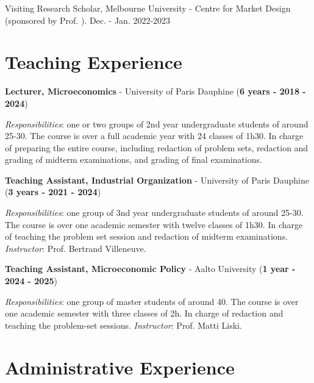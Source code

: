\documentclass[letterpaper]{article}
\newcommand{\MYhref}[3][darkblue]{\href{#2}{\color{#1}{#3}}}%
\renewenvironment{itemize}{
  \begin{list}{}{
    \setlength{\leftmargin}{1.5em}
  }
}{
  \end{list}
}
\begin{document}
\begin{itemize}
\item Visiting Research Scholar, Melbourne University - Centre for Market Design (sponsored by Prof. \textcolor{darkcerulean}{\MYhref{https://sites.google.com/view/dprbyrne/david-p-byrne-university-of-melbourne}{David Byrne}}). Dec. - Jan. 2022-2023
\end{itemize}


\section*{\textbf{Teaching Experience}}

\begin{itemize}

\item \textbf{Lecturer, Microeconomics} - University of Paris Dauphine (\textbf{6 years - 2018 - 2024})

\textit{Responsibilities}: one or two groups of 2nd year undergraduate students of around 25-30. The course is over a full academic year with 24 classes of 1h30. In charge of preparing the entire course, including redaction of problem sets, redaction and grading of midterm examinations, and grading of final examinations.

\item \textbf{Teaching Assistant, Industrial Organization} - University of Paris Dauphine (\textbf{3 years - 2021 - 2024})

\textit{Responsibilities}: one group of 3nd year undergraduate students of around 25-30. The course is over one academic semester with twelve classes of 1h30. In charge of teaching the problem set session and redaction of midterm examinations. \textit{Instructor}: Prof. Bertrand Villeneuve.  

\item \textbf{Teaching Assistant, Microeconomic Policy} - Aalto University (\textbf{1 year - 2024 - 2025})

\textit{Responsibilities}: one group of master students of around 40. The course is over one academic semester with three classes of 2h. In charge of redaction and teaching the problem-set sessions. \textit{Instructor}: Prof. Matti Liski.  
\end{itemize}

\section*{\textbf{Administrative Experience}}
\end{document}
